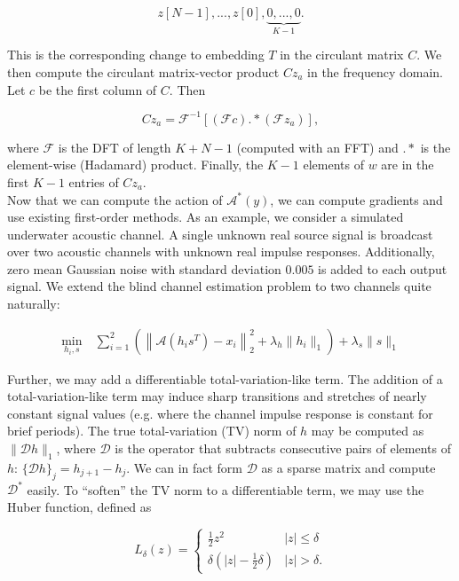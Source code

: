 \documentclass[journal]{IEEEtran}
\begin{document}
\[ z[N-1], ..., z[0], \underbrace{0, ..., 0}_{K-1}. \]

\noindent This is the corresponding change to embedding $T$ in the circulant matrix $C$.  We then compute the circulant matrix-vector product $Cz_a$ in the frequency domain.  Let $c$ be the first column of $C$.  Then

\[ Cz_a = \mathcal{F}^{-1}\left[\left(\mathcal{F}c\right).*\left(\mathcal{F}z_a\right)\right], \] 

\noindent where $\mathcal{F}$ is the DFT of length $K+N-1$ (computed with an FFT) and $.*$ is the element-wise (Hadamard) product.  Finally, the $K-1$ elements of $w$ are in the first $K-1$ entries of $Cz_a$.\\

Now that we can compute the action of $\mathcal{A}^\ast(y)$, we can compute gradients and use existing first-order methods.  As an example, we consider a simulated underwater acoustic channel.  A single unknown real source signal is broadcast over two acoustic channels with unknown real impulse responses.  Additionally, zero mean Gaussian noise with standard deviation $0.005$ is added to each output signal.  We extend the blind channel estimation problem to two channels quite naturally:

\begin{align*}
   \min_{h_i,s} ~&\sum_{i=1}^2\left(\left\|\mathcal{A}(h_is^T) - x_i\right\|_2^2 + \lambda_{h}\|h_i\|_1\right) + \lambda_s\|s\|_1
\end{align*}

\noindent Further, we may add a differentiable total-variation-like term.  The addition of a total-variation-like term may induce sharp transitions and stretches of nearly constant signal values (e.g. where the channel impulse response is constant for brief periods).  The true total-variation (TV) norm of $h$ may be computed as $\|\mathcal{D}h\|_1$, where $\mathcal{D}$ is the operator that subtracts consecutive pairs of elements of $h$: $\{\mathcal{D}h\}_j = h_{j+1} - h_j$.  We can in fact form $\mathcal{D}$ as a sparse matrix and compute $\mathcal{D}^\ast$ easily.  To ``soften'' the TV norm to a differentiable term, we may use the Huber function, defined as

\[ L_\delta(z) = \left\{\begin{array}{ll} \frac{1}{2}z^2 & |z| \le \delta\\ \delta\left(|z| - \frac{1}{2}\delta\right) & |z| > \delta. \end{array}\right. \] 
\end{document}
